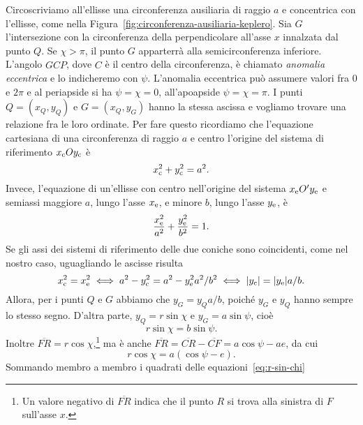 Circoscriviamo all'ellisse una circonferenza ausiliaria di raggio $a$ e
concentrica con l'ellisse, come nella
Figura~\ref{fig:circonferenza-ausiliaria-keplero}. Sia $G$ l'intersezione con
la circonferenza della perpendicolare all'asse $x$ innalzata dal punto $Q$. Se
$\chi > \pi$, il punto $G$ apparterrà alla semicirconferenza inferiore. L'angolo
$G\widehat{C}P$, dove $C$ è il centro della circonferenza, è chiamato
\emph{anomalia eccentrica} e lo indicheremo con $\psi$. L'anomalia eccentrica
può assumere valori fra $0$ e $2\pi$ e al periapside si ha $\psi = \chi = 0$,
all'apoapside $\psi = \chi = \pi$. I punti $Q=(x_Q,y_Q)$ e $G=(x_Q,y_G)$ hanno
la stessa ascissa e vogliamo trovare una relazione fra le loro ordinate. Per
fare questo ricordiamo che l'equazione cartesiana di una circonferenza di raggio
$a$ e centro l'origine del sistema di riferimento $x_\textup{c}Oy_\textup{c}$ è
\begin{equation}
  x_\textup{c}^2 + y_\textup{c}^2 = a^2.
\end{equation}
Invece, l'equazione di un'ellisse con centro nell'origine del sistema
$x_\textup{e}O'y_\textup{e}$ e semiassi maggiore $a$, lungo l'asse
$x_\textup{e}$, e minore $b$, lungo l'asse $y_\textup{e}$, è
\begin{equation}
    \frac{x_\textup{e}^2}{a^2} + \frac{y_\textup{e}^2}{b^2} = 1.
\end{equation}
Se gli assi dei sistemi di riferimento delle due coniche sono coincidenti, come
nel nostro caso, uguagliando le ascisse risulta
\begin{equation}
  x_\textup{c}^2 = x_\textup{e}^2 \iff a^2 - y_\textup{c}^2 = a^2 -
  y_\textup{e}^2a^2/b^2 \iff \lvert y_\textup{c}\rvert = \lvert y_\textup{e}\rvert a/b.
\end{equation}
Allora, per i punti $Q$ e $G$ abbiamo che $y_G = y_Qa/b$, poiché $y_G$ e $y_Q$
hanno sempre lo stesso segno. D'altra parte, $y_Q = r\sin\chi$ e
$y_G = a\sin\psi$, cioè
\begin{equation}
  \label{eq:r-sin-chi}
  r\sin\chi = b\sin\psi.
\end{equation}
Inoltre $\overline{FR} =
r\cos\chi$,\footnote{Un
  valore negativo di $\overline{FR}$ indica che il punto $R$ si trova alla
  sinistra di $F$ sull'asse $x$.} ma è anche $\overline{FR} = \overline{CR} -
\overline{CF} = a\cos\psi - ae$, da cui
\begin{equation}
  \label{eq:r-cos-chi}
  r\cos\chi = a(\cos\psi - e).
\end{equation}
Sommando membro a membro i quadrati delle equazioni~\eqref{eq:r-sin-chi}
